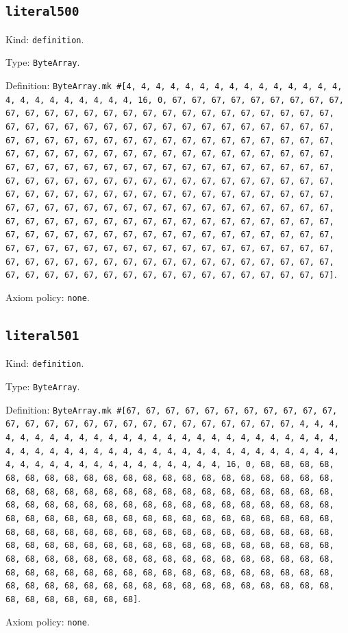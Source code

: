 \documentclass[11pt]{article}
\begin{document}
\subsection*{\texttt{literal500}}
\noindent Kind: \texttt{definition}.\par
\noindent Type: \texttt{ByteArray}.\par
\noindent Definition: \texttt{ByteArray.mk \#[4, 4, 4, 4, 4, 4, 4, 4, 4, 4, 4, 4, 4, 4, 4, 4, 4, 4, 4, 4, 4, 4, 4, 4, 16, 0, 67, 67, 67, 67, 67, 67, 67, 67, 67, 67, 67, 67, 67, 67, 67, 67, 67, 67, 67, 67, 67, 67, 67, 67, 67, 67, 67, 67, 67, 67, 67, 67, 67, 67, 67, 67, 67, 67, 67, 67, 67, 67, 67, 67, 67, 67, 67, 67, 67, 67, 67, 67, 67, 67, 67, 67, 67, 67, 67, 67, 67, 67, 67, 67, 67, 67, 67, 67, 67, 67, 67, 67, 67, 67, 67, 67, 67, 67, 67, 67, 67, 67, 67, 67, 67, 67, 67, 67, 67, 67, 67, 67, 67, 67, 67, 67, 67, 67, 67, 67, 67, 67, 67, 67, 67, 67, 67, 67, 67, 67, 67, 67, 67, 67, 67, 67, 67, 67, 67, 67, 67, 67, 67, 67, 67, 67, 67, 67, 67, 67, 67, 67, 67, 67, 67, 67, 67, 67, 67, 67, 67, 67, 67, 67, 67, 67, 67, 67, 67, 67, 67, 67, 67, 67, 67, 67, 67, 67, 67, 67, 67, 67, 67, 67, 67, 67, 67, 67, 67, 67, 67, 67, 67, 67, 67, 67, 67, 67, 67, 67, 67, 67, 67, 67, 67, 67, 67, 67, 67, 67, 67, 67, 67, 67, 67, 67, 67, 67, 67, 67, 67, 67, 67, 67, 67, 67, 67, 67, 67, 67, 67, 67, 67, 67, 67, 67, 67, 67, 67, 67, 67, 67, 67, 67, 67, 67, 67, 67, 67, 67]}.\par
\noindent Axiom policy: \texttt{none}.\par
\subsection*{\texttt{literal501}}
\noindent Kind: \texttt{definition}.\par
\noindent Type: \texttt{ByteArray}.\par
\noindent Definition: \texttt{ByteArray.mk \#[67, 67, 67, 67, 67, 67, 67, 67, 67, 67, 67, 67, 67, 67, 67, 67, 67, 67, 67, 67, 67, 67, 67, 67, 67, 67, 4, 4, 4, 4, 4, 4, 4, 4, 4, 4, 4, 4, 4, 4, 4, 4, 4, 4, 4, 4, 4, 4, 4, 4, 4, 4, 4, 4, 4, 4, 4, 4, 4, 4, 4, 4, 4, 4, 4, 4, 4, 4, 4, 4, 4, 4, 4, 4, 4, 4, 4, 4, 4, 4, 4, 4, 4, 4, 4, 4, 4, 4, 4, 4, 16, 0, 68, 68, 68, 68, 68, 68, 68, 68, 68, 68, 68, 68, 68, 68, 68, 68, 68, 68, 68, 68, 68, 68, 68, 68, 68, 68, 68, 68, 68, 68, 68, 68, 68, 68, 68, 68, 68, 68, 68, 68, 68, 68, 68, 68, 68, 68, 68, 68, 68, 68, 68, 68, 68, 68, 68, 68, 68, 68, 68, 68, 68, 68, 68, 68, 68, 68, 68, 68, 68, 68, 68, 68, 68, 68, 68, 68, 68, 68, 68, 68, 68, 68, 68, 68, 68, 68, 68, 68, 68, 68, 68, 68, 68, 68, 68, 68, 68, 68, 68, 68, 68, 68, 68, 68, 68, 68, 68, 68, 68, 68, 68, 68, 68, 68, 68, 68, 68, 68, 68, 68, 68, 68, 68, 68, 68, 68, 68, 68, 68, 68, 68, 68, 68, 68, 68, 68, 68, 68, 68, 68, 68, 68, 68, 68, 68, 68, 68, 68, 68, 68, 68, 68, 68, 68, 68, 68, 68, 68, 68, 68, 68, 68, 68, 68]}.\par
\noindent Axiom policy: \texttt{none}.\par
\end{document}
